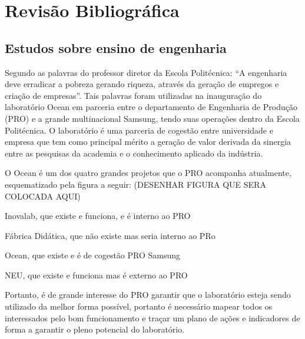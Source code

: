 \chapter[Revisão Bibliográfica]{Revisão Bibliográfica}
\label{chap:revisao}
\section{Estudos sobre ensino de engenharia}
\label{cha:ensino}

Segundo as palavras do professor diretor da Escola Politécnica: “A engenharia deve erradicar a pobreza gerando riqueza, através da geração de empregos e criação de empresas”. Tais palavras foram utilizadas na inauguração do laboratório Ocean em parceria entre o departamento de Engenharia de Produção (PRO) e a grande multinacional Samsung, tendo suas operações dentro da Escola Politécnica. O laboratório é uma parceria de cogestão entre universidade e empresa que tem como principal mérito a geração de valor derivada da sinergia entre as pesquisas da academia e o conhecimento aplicado da indústria. 

O Ocean é um dos quatro grandes projetos que o PRO acompanha atualmente, esquematizado pela figura a seguir: (DESENHAR FIGURA QUE SERA COLOCADA AQUI)

Inovalab, que existe e funciona, e é interno ao PRO

Fábrica Didática, que não existe mas seria interno ao PRo

Ocean, que existe e é de cogestão PRO Samsung

NEU, que existe e funciona mas é externo ao PRO

Portanto, é de grande interesse do PRO garantir que o laboratório esteja sendo utilizado da melhor forma possível, portanto é necessário mapear todos os interessados pelo bom funcionamento e traçar um plano de ações e indicadores de forma a garantir o pleno potencial do laboratório.
